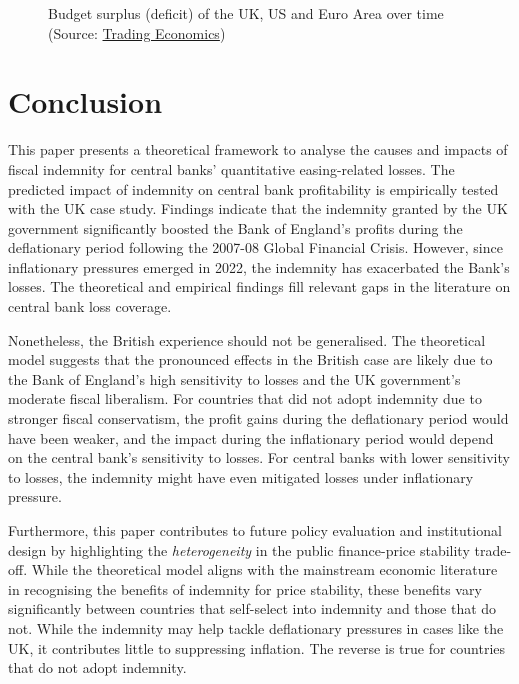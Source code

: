 \documentclass[
  a4paper,
  abstract=true]{scrartcl}
\makeatletter
\newcommand*\pandocbounded[1]{%
  \sbox\pandoc@box{#1}%
  \Gscale@div\@tempa{\textheight}{\dimexpr\ht\pandoc@box+\dp\pandoc@box\relax}%
  \Gscale@div\@tempb{\linewidth}{\wd\pandoc@box}%
  \ifdim\@tempb\p@<\@tempa\p@\let\@tempa\@tempb\fi%
  \ifdim\@tempa\p@<\p@\scalebox{\@tempa}{\usebox\pandoc@box}%
  \else\usebox{\pandoc@box}%
  \fi%
}
\theoremstyle{definition}
\makeatother
\begin{document}
\begin{figure}[H]

\centering{

\pandocbounded{\texttt{[image: BailoutCB\_files/figure-pdf/fig-budget-1.pdf]}}

}

\caption{\label{fig-budget}Budget surplus (deficit) of the UK, US and
Euro Area over time (Source:
\href{https://tradingeconomics.com/}{Trading Economics})}

\end{figure}%

\section{Conclusion}\label{sec-conclusion}

This paper presents a theoretical framework to analyse the causes and
impacts of fiscal indemnity for central banks' quantitative
easing-related losses. The predicted impact of indemnity on central bank
profitability is empirically tested with the UK case study. Findings
indicate that the indemnity granted by the UK government significantly
boosted the Bank of England's profits during the deflationary period
following the 2007-08 Global Financial Crisis. However, since
inflationary pressures emerged in 2022, the indemnity has exacerbated
the Bank's losses. The theoretical and empirical findings fill relevant
gaps in the literature on central bank loss coverage.

Nonetheless, the British experience should not be generalised. The
theoretical model suggests that the pronounced effects in the British
case are likely due to the Bank of England's high sensitivity to losses
and the UK government's moderate fiscal liberalism. For countries that
did not adopt indemnity due to stronger fiscal conservatism, the profit
gains during the deflationary period would have been weaker, and the
impact during the inflationary period would depend on the central bank's
sensitivity to losses. For central banks with lower sensitivity to
losses, the indemnity might have even mitigated losses under
inflationary pressure.

Furthermore, this paper contributes to future policy evaluation and
institutional design by highlighting the \emph{heterogeneity} in the
public finance-price stability trade-off. While the theoretical model
aligns with the mainstream economic literature in recognising the
benefits of indemnity for price stability, these benefits vary
significantly between countries that self-select into indemnity and
those that do not. While the indemnity may help tackle deflationary
pressures in cases like the UK, it contributes little to suppressing
inflation. The reverse is true for countries that do not adopt
indemnity.
\end{document}
